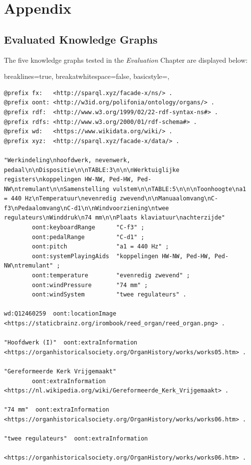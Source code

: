 \UseRawInputEncoding
\chapter{Appendix}
\section{Evaluated Knowledge Graphs}
The five knowledge graphs tested in the \textit{Evaluation} Chapter are displayed below:

\lstset
{
    breaklines=true,
    breakatwhitespace=false,
    basicstyle=\linespread{1}\ttfamily,
}
\begin{lstlisting}[caption={Part14\_000Brouwershaven}]
@prefix fx:   <http://sparql.xyz/facade-x/ns/> .
@prefix oont: <http://w3id.org/polifonia/ontology/organs/> .
@prefix rdf:  <http://www.w3.org/1999/02/22-rdf-syntax-ns#> .
@prefix rdfs: <http://www.w3.org/2000/01/rdf-schema#> .
@prefix wd:   <https://www.wikidata.org/wiki/> .
@prefix xyz:  <http://sparql.xyz/facade-x/data/> .

"Werkindeling\nhoofdwerk, nevenwerk, pedaal\n\nDispositie\n\nTABLE:3\n\n\nWerktuiglijke registers\nkoppelingen HW-NW, Ped-HW, Ped-NW\ntremulant\n\nSamenstelling vulstem\n\nTABLE:5\n\n\nToonhoogte\na1 = 440 Hz\nTemperatuur\nevenredig zwevend\n\nManuaalomvang\nC-f3\nPedaalomvang\nC-d1\n\nWindvoorziening\ntwee regulateurs\nWinddruk\n74 mm\n\nPlaats klaviatuur\nachterzijde"
        oont:keyboardRange      "C-f3" ;
        oont:pedalRange         "C-d1" ;
        oont:pitch              "a1 = 440 Hz" ;
        oont:systemPlayingAids  "koppelingen HW-NW, Ped-HW, Ped-NW\ntremulant" ;
        oont:temperature        "evenredig zwevend" ;
        oont:windPressure       "74 mm" ;
        oont:windSystem         "twee regulateurs" .

wd:Q12460259  oont:locationImage  <https://staticbrainz.org/irombook/reed_organ/reed_organ.png> .

"Hoofdwerk (I)"  oont:extraInformation  <https://organhistoricalsociety.org/OrganHistory/works/works05.htm> .

"Gereformeerde Kerk Vrijgemaakt"
        oont:extraInformation  <https://nl.wikipedia.org/wiki/Gereformeerde_Kerk_Vrijgemaakt> .

"74 mm"  oont:extraInformation  <https://organhistoricalsociety.org/OrganHistory/works/works06.htm> .

"twee regulateurs"  oont:extraInformation
                <https://organhistoricalsociety.org/OrganHistory/works/works06.htm> .


\end{lstlisting}
